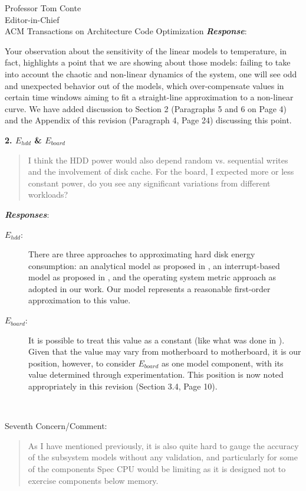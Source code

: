 \documentclass[10pt]{letter} %
\newenvironment{rviewcomment}
{~\\%
\begin{bfseries}}
{\end{bfseries}}
\newcommand{\rviewresponse}{\textbf{\textit{Response}}:}
\newcommand{\rviewresponses}{\textbf{\textit{Responses}}:}
\begin{document}
\begin{letter}{Professor Tom Conte \\
Editor-in-Chief \\
ACM Transactions on Architecture Code Optimization }
\rviewresponse

Your observation about the sensitivity of the linear models to
temperature, in fact, highlights a point that we are showing about those
models: failing to take into account the chaotic and non-linear dynamics
of the system, one will see odd and unexpected behavior out of the
models, which over-compensate values in certain time windows aiming
to fit a straight-line approximation to a non-linear curve.  We have
added discussion to Section 2 (Paragraphs 5 and 6 on Page 4) and the
Appendix of this revision (Paragraph 4, Page 24) discussing this point.

\textbf{2. $E_{hdd}$ \& $E_{board}$}
\label{sec-3-6-2}
\begin{quote}
\begin{itshape}
I think the HDD power would also depend random vs. sequential writes and
the involvement of disk cache. For the board, I expected more or less
constant power, do you see any significant variations from different
workloads?
\end{itshape}
\end{quote}
\rviewresponses
\begin{description}
\item[\textbf{$E_{hdd}$}:] There are three approaches to approximating hard
  disk energy consumption: an analytical model as proposed in
  \cite{Gurumurthi2005}, an interrupt-based model as proposed in
  \cite{Bircher2011}, and the operating system metric approach as
  adopted in our work.  Our model represents a reasonable first-order
  approximation to this value.
\item[\textbf{$E_{board}$}:] It is possible to treat this value as a constant
  (like what was done in \cite{Bircher2011}).  Given that the value may
  vary from motherboard to motherboard, it is our position, however, to consider
  $E_{board}$ as one model component, with its value determined through
  experimentation.  This position is now noted appropriately in this
  revision (Section 3.4, Page 10).
\end{description}

\begin{rviewcomment}
  Seventh Concern/Comment:
\end{rviewcomment}
\begin{quote}
\begin{itshape}
As I have mentioned previously, it is also quite hard to gauge the
accuracy of the subsystem models without any validation, and
particularly for some of the components Spec CPU would be limiting as it
is designed not to exercise components below memory.
\end{itshape}
\end{quote}


\end{letter}
\end{document}
